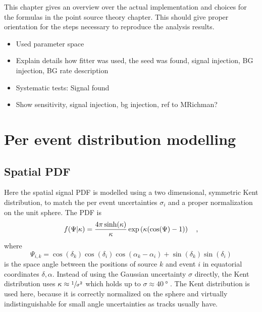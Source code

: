 This chapter gives an overview over the actual implementation and choices for the formulas in the point source theory chapter.
This should give proper orientation for the steps necessary to reproduce the analysis results.

\begin{itemize}
  \item Used parameter space
  \item Explain details how fitter was used, the seed was found, signal injection, BG injection, BG rate description
  \item Systematic tests: Signal found
  \item Show sensitivity, signal injection, bg injection, ref to MRichman?
\end{itemize}


\section{Per event distribution modelling}
\subsection*{Spatial PDF}
Here the spatial signal PDF is modelled using a two dimensional, symmetric Kent distribution, to match the per event uncertainties $\sigma_i$ and a proper normalization on the unit sphere.
The PDF is
\begin{equation}
  f(\Psi|\kappa)
  = \frac{4\pi \sinh(\kappa)}{\kappa}\exp\left(\kappa(\cos(\Psi)-1)\right)
  \quad\text{,}
\end{equation}
where
\begin{equation}
  \Psi_{i,k}
  = \cos(\delta_k)\cos(\delta_i)\cos(\alpha_k - \alpha_i) +
    \sin(\delta_k)\sin(\delta_i)
\end{equation}
is the space angle between the positions of source $k$ and event $i$ in equatorial coordinates $\delta, \alpha$.
Instead of using the Gaussian uncertainty $\sigma$ directly, the Kent distribution uses $\kappa \approx \sfrac{1}{\sigma^2}$ which holds up to $\sigma \approx \SI{40}{\degree}$ .
The Kent distribution is used here, because it is correctly normalized on the sphere and virtually indistinguishable for small angle uncertainties as tracks usually have.

